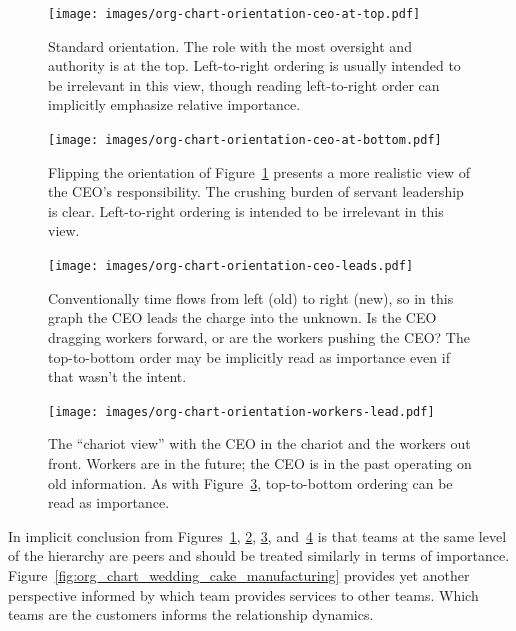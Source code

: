 \begin{figure}
\begin{center}
\texttt{[image: images/org-chart-orientation-ceo-at-top.pdf]}
\end{center}
\caption{Standard orientation. The role with the most oversight and authority is at the top. Left-to-right ordering is usually intended to be irrelevant in this view, though reading left-to-right  order can implicitly emphasize relative importance.}
\label{fig:org_chart_orientation_ceo-at-top}
\end{figure}

\begin{figure}
\begin{center}
\texttt{[image: images/org-chart-orientation-ceo-at-bottom.pdf]}
\end{center}
\caption{Flipping the orientation of Figure~\ref{fig:org_chart_orientation_ceo-at-top} presents a more realistic view of the CEO's responsibility. The crushing burden of servant leadership is clear. Left-to-right ordering is intended to be irrelevant in this view.}
\label{fig:org_chart_orientation_ceo-at-bottom}
\end{figure}

\begin{figure}
\begin{center}
\texttt{[image: images/org-chart-orientation-ceo-leads.pdf]}
\end{center}
\caption{Conventionally time flows from left (old) to right (new), so in this graph the CEO leads the charge into the unknown. Is the CEO dragging workers forward, or are the workers pushing the CEO? The top-to-bottom order may be implicitly read as importance even if that wasn't the intent. }
\label{fig:org_chart_orientation_ceo-leads}
\end{figure}

\begin{figure}
\begin{center}
\texttt{[image: images/org-chart-orientation-workers-lead.pdf]}
\end{center}
\caption{The ``chariot view'' with the CEO in the chariot and the workers out front. Workers are in the future; the CEO is in the past operating on old information. As with Figure~\ref{fig:org_chart_orientation_ceo-leads}, top-to-bottom ordering can be read as importance. }
\label{fig:org_chart_orientation_ceo-follows}
\end{figure}

In implicit conclusion from Figures~\ref{fig:org_chart_orientation_ceo-at-top}, \ref{fig:org_chart_orientation_ceo-at-bottom}, \ref{fig:org_chart_orientation_ceo-leads}, and~\ref{fig:org_chart_orientation_ceo-follows} is that teams at the same level of the hierarchy are peers and should be treated similarly in terms of importance. Figure~\ref{fig:org_chart_wedding_cake_manufacturing} provides yet another perspective informed by which team provides services to other teams. Which teams are the customers informs the relationship dynamics.

